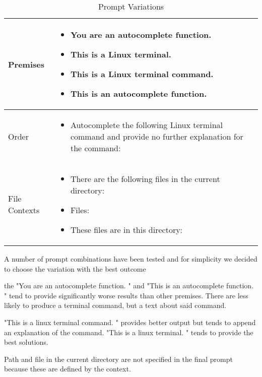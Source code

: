 \begin{table}[htbp]
    \centering
    \caption{Prompt Variations}
    \begin{tabular}{|p{5cm}|p{8cm}|}
        \hline
        Premises & 
        \begin{itemize}
            \item You are an autocomplete function.
            \item This is a Linux terminal.
            \item This is a Linux terminal command.
            \item This is an autocomplete function.
        \end{itemize}
        \\
        \hline
        Order & 
        \begin{itemize}
            \item Autocomplete the following Linux terminal command and provide no further explanation for the command:
        \end{itemize}
        \\
        \hline
        File Contexts & 
        \begin{itemize}
            \item There are the following files in the current directory:
            \item Files:
            \item These files are in this directory:
        \end{itemize}
        \\
        \hline
    \end{tabular}
\end{table}


 

A number of prompt combinations have been tested and for simplicity we decided to choose the variation with the best outcome 


the "You are an autocomplete function. " and "This is an autocomplete function. " tend to provide significantly worse results than other premises. There are less likely to produce a terminal command, but a text about said command.

"This is a linux terminal command. " provides better output but tends to append an explanation of the command. "This is a linux terminal. " tends to provide the best solutions. 



Path and file in the current directory are not specified in the final prompt because these are defined by the context.



